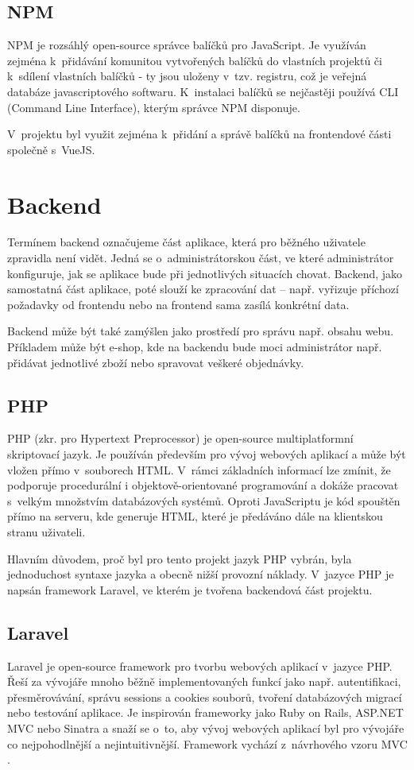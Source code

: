 	\subsection{NPM}\label{sec:npm}
	NPM je rozsáhlý open-source správce balíčků pro JavaScript. Je využíván zejména k~přidávání komunitou vytvořených balíčků do vlastních projektů či k~sdílení vlastních balíčků - ty jsou uloženy v~tzv. registru, což je veřejná databáze javascriptového softwaru. K~instalaci balíčků se nejčastěji používá CLI (Command Line Interface), kterým správce NPM disponuje. \cite{NPM}
	
	V~projektu byl využit zejména k~přidání a správě balíčků na frontendové části společně s~VueJS.

\section{Backend}
Termínem backend označujeme část aplikace, která pro běžného uživatele zpravidla není vidět. Jedná se o~administrátorskou část, ve které administrátor konfiguruje, jak se aplikace bude při jednotlivých situacích chovat. Backend, jako samostatná část aplikace, poté slouží ke zpracování dat – např. vyřizuje příchozí požadavky od frontendu nebo na frontend sama zasílá konkrétní data.

Backend může být také zamýšlen jako prostředí pro správu např. obsahu webu. Příkladem může být e-shop, kde na backendu bude moci administrátor např. přidávat jednotlivé zboží nebo spravovat veškeré objednávky.  \cite{BE1}\cite{BE2}
	
	\subsection{PHP}
	PHP (zkr. pro Hypertext Preprocessor) je open-source multiplatformní skriptovací jazyk. Je používán především pro vývoj webových aplikací a může být vložen přímo v~souborech HTML. V~rámci základních informací lze zmínit, že podporuje procedurální i objektově-orientované programování a dokáže pracovat s~velkým množstvím databázových systémů. Oproti JavaScriptu je kód spouštěn přímo na serveru, kde generuje HTML, které je předáváno dále na klientskou stranu uživateli. \cite{PHP1}\cite{PHP2}
	
	Hlavním důvodem, proč byl pro tento projekt jazyk PHP vybrán, byla jednoduchost syntaxe jazyka a obecně nižší provozní náklady. V~jazyce PHP je napsán framework Laravel, ve kterém je tvořena backendová část projektu.
	
	\subsection{Laravel}
	Laravel je open-source framework pro tvorbu webových aplikací v~jazyce PHP. Řeší za vývojáře mnoho běžně implementovaných funkcí jako např. autentifikaci, přesměrovávání, správu sessions a cookies souborů, tvoření databázových migrací nebo testování aplikace. Je inspirován frameworky jako Ruby on Rails, ASP.NET MVC nebo Sinatra a snaží se o~to, aby vývoj webových aplikací byl pro vývojáře co nejpohodlnější a nejintuitivnější. \cite{Laravel1} Framework vychází z~návrhového vzoru MVC \cite{LaravelMVC}.
	
